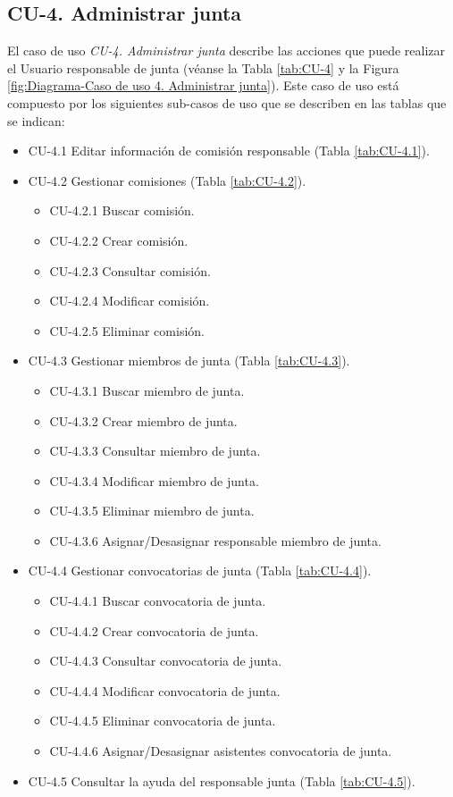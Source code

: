 \newpage


\subsection{CU-4. Administrar junta}\label{sec:CU-4}    
El caso de uso \textit{CU-4. Administrar junta} describe las acciones que puede realizar el Usuario responsable de junta (véanse la Tabla \ref{tab:CU-4} y la Figura \ref{fig:Diagrama-Caso de uso 4. Administrar junta}). Este caso de uso está compuesto por los siguientes sub-casos de uso que se describen en las tablas que se indican:
\begin{itemize}
  \item CU-4.1 Editar información de comisión responsable (Tabla \ref{tab:CU-4.1}).
   \item CU-4.2 Gestionar comisiones (Tabla \ref{tab:CU-4.2}).
          \begin{itemize}
            \item CU-4.2.1 Buscar comisión.
            \item CU-4.2.2 Crear comisión.
            \item CU-4.2.3 Consultar comisión.
            \item CU-4.2.4 Modificar comisión.
            \item CU-4.2.5 Eliminar comisión.
        \end{itemize}
  \item CU-4.3 Gestionar miembros de junta (Tabla \ref{tab:CU-4.3}).
          \begin{itemize}
            \item CU-4.3.1 Buscar miembro de junta.
            \item CU-4.3.2 Crear  miembro de junta.
            \item CU-4.3.3 Consultar miembro de junta.
            \item CU-4.3.4 Modificar miembro de junta.
            \item CU-4.3.5 Eliminar miembro de junta.
            \item CU-4.3.6 Asignar/Desasignar responsable miembro de junta.
        \end{itemize}
    \item CU-4.4 Gestionar convocatorias de junta (Tabla \ref{tab:CU-4.4}).
          \begin{itemize}
            \item CU-4.4.1 Buscar convocatoria de junta.
            \item CU-4.4.2 Crear convocatoria de junta.
            \item CU-4.4.3 Consultar convocatoria de junta.
            \item CU-4.4.4 Modificar convocatoria de junta.
            \item CU-4.4.5 Eliminar convocatoria de junta.
            \item CU-4.4.6 Asignar/Desasignar asistentes convocatoria de junta.
        \end{itemize}
 \item CU-4.5 Consultar la ayuda del responsable junta (Tabla \ref{tab:CU-4.5}).
\end{itemize}


